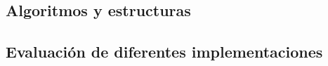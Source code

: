 





\subsection{Algoritmos y estructuras}
\label{sec:arm:fim:algoritmos-y-estructuras}





\subsection{Evaluación de diferentes implementaciones}
\label{sec:arm:fim:evaluacion-de-diferentes-implementaciones}

